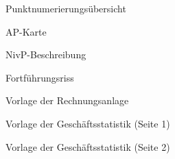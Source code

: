 \begin{figure}[htbp]
	\centering
	\caption{Punktnumerierungsübersicht}
	\label{fig:punktnumerierungsuebersicht}
\end{figure}
\begin{figure}[htbp]
	\centering
	\caption{AP-Karte}
	\label{fig:ap-karte}
\end{figure}
\begin{figure}[htbp]
	\centering
	\caption{NivP-Beschreibung}
	\label{fig:nivp-beschreibung}
\end{figure}
\begin{figure}[htbp]
	\centering
	\caption{Fortführungsriss}
	\label{fig:fortfuehrungsriss}
\end{figure}
\begin{figure}[htbp]
	\centering
	\caption{Vorlage der Rechnungsanlage}
	\label{fig:vorlage_rechnungsanlage}
\end{figure}
\begin{figure}[htbp]
	\centering
	\caption{Vorlage der Geschäftsstatistik (Seite 1)}
	\label{fig:vorlage_geschaeftsstatistik_1}
\end{figure}
\begin{figure}[htbp]
	\centering
	\caption{Vorlage der Geschäftsstatistik (Seite 2)}
	\label{fig:vorlage_geschaeftsstatistik_2}
\end{figure}


